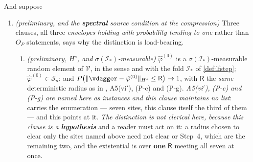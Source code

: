 \begin{proposition}[The rate for the $\varphi$-step]
And suppose
\begin{enumerate}
\item[(P-a)] \emph{(preliminary, and the \textbf{spectral} source condition at the compression)} Three
clauses, all three \emph{envelopes holding with probability tending to one} rather than $O_P$
statements,  says why the distinction is load-bearing.
\begin{enumerate}
\item[(P-a.1)] \emph{(preliminary, $H^{s}$, and $\sigma(\mathcal I_\ast)$-measurable)}
$\hat\varphi^{(0)}$ is a $\sigma(\mathcal I_\ast)$-measurable random element of $\mathcal V$, in the sense and
with the fold $\mathcal I_\ast$ of \cref{def:lfstep}; $\hat\varphi^{(0)}\in\mathcal S_n$; and
$P\big(\|\vdagger-\hat\varphi^{(0)}\|_{H^{s}}\le\mathsf R\big)\to1$, with $\mathsf R$ the
\emph{same} deterministic radius as in , A5(vi$'$), (P-c) and (P-g).
\emph{A5(vi$'$), (P-c) and (P-g) are named here as instances and this clause maintains no list}:
 carries the enumeration --- seven sites, this clause itself the third of
them --- and this points at it. \emph{The distinction is not clerical here, because this clause is a
\textbf{hypothesis}} and a reader must act on it: a radius chosen to clear only the sites named above
need not clear  or  Step~4, which are the remaining two, and the
existential is over \textbf{one} $\mathsf R$ meeting all seven at once.

\end{enumerate}
\end{enumerate}
\end{proposition}
